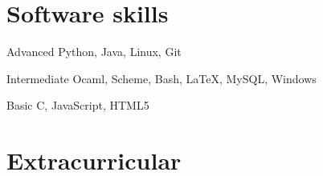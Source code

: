 \documentclass{tccv}
\begin{document}
\section{Software skills}

\begin{factlist}

\item{Advanced}
     {Python, Java, Linux, Git}

\item{Intermediate}
     {Ocaml, Scheme, Bash, \LaTeX, MySQL, Windows}

\item{Basic}
     {C, JavaScript, HTML5}

\end{factlist}

\section{Extracurricular}
\end{document}
